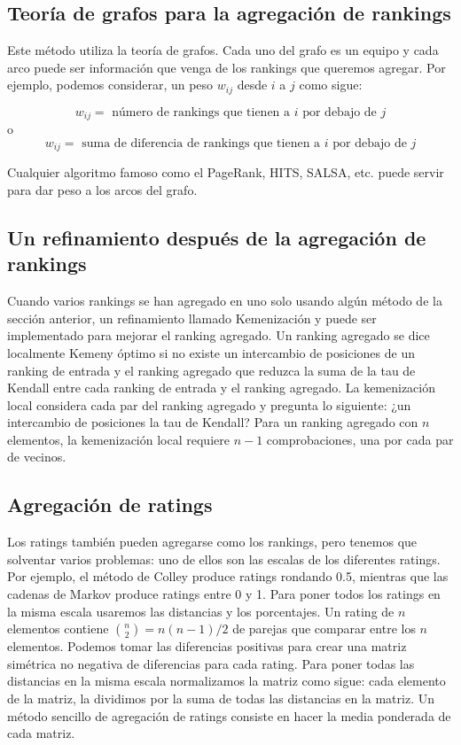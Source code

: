 \subsection{Teoría de grafos para la agregación de rankings}
 
 Este método utiliza la teoría de grafos. Cada uno del grafo es un equipo y cada arco puede ser información que venga de los rankings que queremos agregar. Por ejemplo, podemos considerar, un peso $w_{ij}$ desde $i$ a $j$ como sigue:
 
 \[ w_{ij} = \text{ número de rankings que tienen a } i \text{ por debajo de } j \]
 o 
 \[ w_{ij} = \text{ suma de diferencia de rankings que tienen a } i \text{ por debajo de } j \]
 
 Cualquier algoritmo famoso como el PageRank, HITS, SALSA, etc. puede servir para dar peso a los arcos del grafo.
 
 \subsection{Un refinamiento después de la agregación de rankings}
 
 Cuando varios rankings se han agregado en uno solo usando algún método de la sección anterior, un refinamiento llamado Kemenización y puede ser implementado para mejorar el ranking agregado. Un ranking agregado se dice localmente Kemeny óptimo si no existe un intercambio de posiciones de un ranking de entrada y el ranking agregado que reduzca la suma de la tau de Kendall entre cada ranking de entrada y el ranking agregado. La kemenización local considera cada par del ranking agregado y pregunta lo siguiente: ¿un intercambio de posiciones la tau de Kendall? Para un ranking agregado con $n$ elementos, la kemenización local requiere $n-1$ comprobaciones, una por cada par de vecinos.
 
 \subsection{Agregación de ratings}
 
 Los ratings también pueden agregarse como los rankings, pero tenemos que solventar varios problemas: uno de ellos son las escalas de los diferentes ratings. Por ejemplo, el método de Colley produce ratings rondando 0.5, mientras que las cadenas de Markov produce ratings entre 0 y 1. Para poner todos los ratings en la misma escala usaremos las distancias y los porcentajes. Un rating de $n$ elementos contiene $\binom{n}{2} = n(n-1)/2$ de parejas que comparar entre los $n$ elementos. Podemos tomar las diferencias positivas para crear una matriz simétrica no negativa de diferencias para cada rating. Para poner todas las distancias en la misma escala normalizamos la matriz como sigue: cada elemento de la matriz, la dividimos por la suma de todas las distancias en la matriz. Un método sencillo de agregación de ratings consiste en hacer la media ponderada de cada matriz.
 
